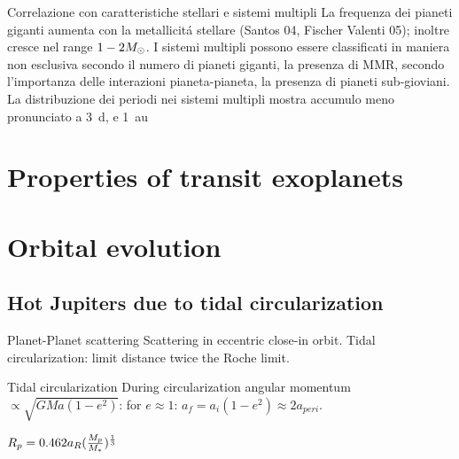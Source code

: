 \begin{wordonframe}{Correlazione con caratteristiche stellari e sistemi multipli}
La frequenza dei pianeti giganti aumenta con la metallicit\'a stellare (Santos 04, Fischer Valenti 05); inoltre cresce nel range $1-2M_{\odot}{}$.
I sistemi multipli possono essere classificati in maniera non esclusiva secondo il numero di pianeti giganti, la presenza di MMR, secondo l'importanza delle interazioni pianeta-pianeta, la presenza di pianeti sub-gioviani.
La distribuzione dei periodi nei sistemi multipli mostra accumulo meno pronunciato a \SI{3}{\day}, e \SI{1}{\astronomicalunit}
\end{wordonframe}


\section{Properties of transit exoplanets}

\section{Orbital evolution}

\subsection{Hot Jupiters due to tidal circularization}

\begin{frame}{Planet-Planet scattering}
Scattering in eccentric close-in orbit. Tidal circularization: limit distance twice the Roche limit.
\end{frame}

\begin{wordonframe}{Tidal circularization}
During circularization angular momentum $\propto \sqrt{GMa(1-e^2)}$: for $e\approx1$: $a_f=a_i(1-e^2)\approx2a_{peri}$.

$R_p=0.462a_R(\frac{M_p}{M_*})^{\frac{1}{3}}$ 
\end{wordonframe}
